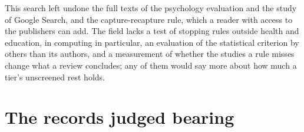 This search left undone the full texts of the psychology evaluation and
the study of Google Search, and the capture-recapture rule, which a
reader with access to the publishers can add.
The field lacks a test of stopping rules outside health and education,
in computing in particular, an evaluation of the statistical criterion
by others than its authors, and a measurement of whether the studies a
rule misses change what a review concludes; any of them would say more
about how much a tier's unscreened rest holds.

\section{The records judged bearing}
\label{sec:stopping-hits}



